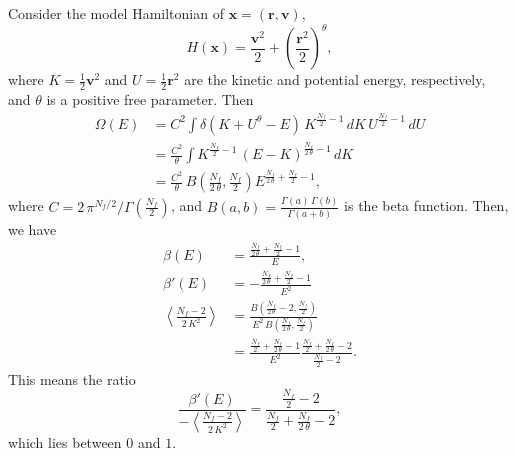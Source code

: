 \documentclass[reprint]{revtex4-1}
\begin{document}
Consider the model Hamiltonian of $\mathbf x = (\mathbf r, \mathbf v)$,
\begin{equation}
  H(\mathbf x)
  =
  \frac{\mathbf v^2} { 2 }
  +
  \left( \frac{\mathbf r^2} { 2 } \right)^\theta
  ,
\end{equation}
%
where $K = \frac 1 2 {\mathbf v}^2$ and
$U = \frac 1 2 {\mathbf r}^2$
are the kinetic and potential energy, respectively,
and $\theta$ is a positive free parameter.
Then
\begin{align*}
  \Omega(E)
  &=
  C^2
  \int
    \delta\left( K + U^\theta - E \right) \,
    K^{\frac{ N_f } 2 - 1} \, dK \, U^{\frac{ N_f } 2 - 1} \, dU
  \\
  &=
  \frac{ C^2 } { \theta }
  \int
  K^{\frac{ N_f } 2 - 1} \, (E - K)^{\frac{ N_f }{ 2 \, \theta } - 1}
    \, dK
  \\
  &=
  \frac{ C^2 }{ \theta } \,
  B\left( \frac{ N_f } {2 \, \theta}, \frac{ N_f } 2 \right)
  E^{ \frac{ N_f }{2 \, \theta} + \frac{N_f}{2} - 1 }
  ,
\end{align*}
where
%
$C = 2 \, \pi^{N_f/2} / \Gamma\left( \frac{ N_f } 2 \right)$,
and
$B(a, b) = \frac{ \Gamma(a) \, \Gamma(b) } { \Gamma(a+b) }$
is the beta function.
%
Then, we have
\begin{align*}
\beta(E)
&=
\frac{ \frac{ N_f } { 2 \, \theta } + \frac{ N_f } 2 - 1 }
     { E }
,
\\
\beta'(E)
&=
-
\frac{ \frac{ N_f } { 2 \, \theta } + \frac{ N_f } 2 - 1 }
     { E^2 }
\\
\left\langle
  \frac{
    N_f - 2
  }
  {
    2 \, K^2
  }
\right\rangle
&=
\frac{
  B\left( \frac{ N_f } { 2  \, \theta } - 2, \frac{ N_f } { 2 } \right)
}
{
  E^2 \, B\left( \frac{ N_f } { 2  \, \theta }, \frac{ N_f } { 2 } \right)
}
\\
&=
\frac{ \frac{ N_f } 2 + \frac{ N_f }{2 \, \theta} - 1 }
     { E^2 }
\frac{ \frac{ N_f } 2 + \frac{ N_f }{2 \, \theta} - 2 }
     { \frac{ N_f } 2 - 2 }
.
\end{align*}
This means the ratio
$$
\frac
{
  \beta'(E)
}
{
  -\left\langle
    \frac{ N_f - 2 } { 2 \, K^2 }
  \right\rangle
}
=
\frac
{
  \frac{ N_f } 2 - 2
}
{
  \frac{ N_f } 2 + \frac{N_f}{2 \, \theta} - 2
}
,
$$
which lies between $0$ and $1$.

%

\end{document}
